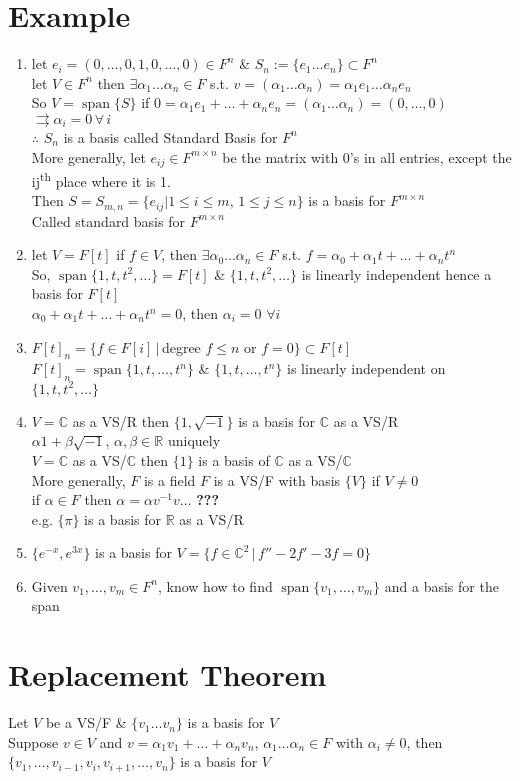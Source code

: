\documentclass[11pt]{article}
\DeclareMathOperator{\Span}{span}
\begin{document}
\section*{Example}
\begin{enumerate}
	\item let $e_i=(0, \ldots, 0, 1, 0, \ldots, 0)\in F^n$ \& $S_n:=\{e_1\ldots e_n\}\subset F^n$\\
	let $V\in F^n$ then $\exists \alpha_1\ldots \alpha_n\in F$ s.t. $v=(\alpha_1\ldots \alpha_n)=\alpha_1e_1\ldots \alpha_ne_n$\\
	So $V=\Span\{S\}$ if $0=\alpha_1e_1+\ldots+\alpha_ne_n=(\alpha_1\ldots\alpha_n)=(0,\ldots, 0)$\\
	$\rightrightarrows \alpha_i=0\, \forall\, i$\\
	$\therefore$ $S_n$ is a basis called Standard Basis for $F^n$\\
	More generally, let $e_{ij}\in F^{m\times n}$ be the matrix with 0's in all entries, except the ij\textsuperscript{th} place where it is 1.\\
	Then $S=S_{m, n}=\{e_{ij}|1\leq i \leq m, \, 1 \leq j \leq n\}$ is a basis for $F^{m\times n}$\\
	Called standard basis for $F^{m\times n}$
	\item let $V=F[t]$ if $f\in V$, then $\exists \alpha_0\ldots\alpha_n\in F$ s.t. $f=\alpha_0+\alpha_1t+\ldots+\alpha_nt^n$\\
	So, $\Span\{1, t, t^2, \ldots\}=F[t]$ \& $\{1, t, t^2, \ldots\}$ is linearly independent hence a basis for $F[t]$\\
	$\alpha_0+\alpha_1t+\ldots+\alpha_nt^n=0$, then $\alpha_i=0$ $\forall i$
	\item $F[t]_n=\{f\in F[i]\,|\,$degree $f\leq n$ or $f=0\}\subset F[t]$\\
	$F[t]_n=\Span\{1, t, \ldots, t^n\}$ \& $\{1, t, \ldots, t^n\}$ is linearly independent on $\{1, t, t^2, \ldots\}$
	\item $V=\mathbb{C}$ as a VS/R then $\{1, \sqrt{-1}\}$ is a basis for $\mathbb{C}$ as a VS/R\\
	$\alpha 1+\beta\sqrt{-1}$, $\alpha, \beta\in \mathbb{R}$ uniquely\\
	$V=\mathbb{C}$ as a VS/$\mathbb{C}$ then $\{1\}$ is a basis of $\mathbb{C}$ as a VS/$\mathbb{C}$\\
	More generally, $F$ is a field $F$ is a VS/F with basis $\{V\}$ if $V\neq 0$\\
	if $\alpha\in F$ then $\alpha=\alpha v^{-1}v\ldots$ \textbf{???}\\
	e.g. $\{\pi\}$ is a basis for $\mathbb{R}$ as a VS/R
	\item $\{e^{-x}, e^{3x}\}$ is a basis for $V=\{f\in \mathbb{C}^2\, |\, f''-2f'-3f=0\}$
	\item Given $v_1, \ldots, v_m \in F^n $, know how to find $\Span\{v_1, \ldots, v_m\}$ and a basis for the span
\end{enumerate}

\section{Replacement Theorem}
Let $V$ be a VS/F \& $\{v_1\ldots v_n\}$ is a basis for $V$\\
Suppose $v\in V$ and $v=\alpha_1v_1+\ldots+\alpha_nv_n$, $\alpha_1\ldots\alpha_n\in F$ with $\alpha_i\neq 0$, then $\{v_1, \ldots, v_{i-1}, v_i, v_{i+1}, \ldots, v_n\}$ is a basis for $V$
\end{document}
